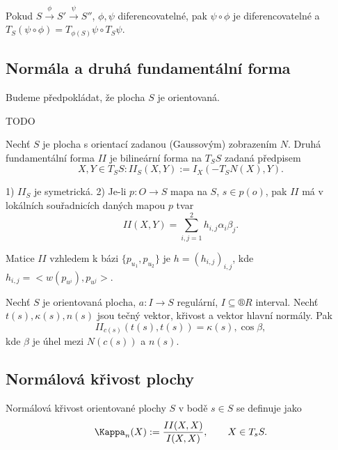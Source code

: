 \documentclass[12pt]{article}                   %
\begin{document}
        \begin{lemma}
            Pokud $S \overset{\phi}{\rightarrow} S' \overset{\psi}{\rightarrow} S''$, $\phi, \psi$ diferencovatelné, pak $\psi \circ \phi$ je diferencovatelné a $T_S(\psi \circ \phi) = T_{\phi(S)}\psi \circ T_S \psi$.
        \end{lemma}

    \subsection{Normála a druhá fundamentální forma}
        \begin{poznamka}
            Budeme předpokládat, že plocha $S$ je orientovaná.
        \end{poznamka}

        TODO

        \begin{definice}
            Nechť $S$ je plocha s orientací zadanou (Gaussovým) zobrazením $N$. Druhá fundamentální forma $II$ je bilineární forma na $T_SS$ zadaná předpisem
            $$ X, Y \in T_SS: II_S(X, Y) := I_X(-T_SN(X), Y). $$
        \end{definice}

        \begin{veta}
            1) $II_S$ je symetrická. 2) Je-li $p: O \rightarrow S$ mapa na $S$, $s \in p(o)$, pak $II$ má v lokálních souřadnicích daných mapou $p$ tvar
            $$ II(X, Y) = \sum_{i, j = 1}^2 h_{i, j}\alpha_i\beta_j. $$ 
        \end{veta}

        \begin{definice}
            Matice $II$ vzhledem k bázi $\{p_{u_1}, p_{u_2}\}$ je $h=(h_{i, j})_{i, j}$, kde $h_{i, j} = <w(p_{u^i}), p_{u^j}>$.
        \end{definice}


        \begin{veta}[Mensier]
            Nechť $S$ je orientovaná plocha, $a: I \rightarrow S$ regulární, $I \subseteq ®R$ interval. Nechť $t(s), \kappa(s), n(s)$ jsou tečný vektor, křivost a vektor hlavní normály. Pak
            $$ II_{c(s)} (t(s), t(s)) = \kappa(s), \cos \beta, $$ 
            kde $\beta$ je úhel mezi $N(c(s))$ a $n(s)$.
        \end{veta}

    \subsection{Normálová křivost plochy}
        \begin{definice}
            Normálová křivost orientované plochy $S$ v bodě $s \in S$ se definuje jako
            $$ \Kappa_n(X) := \frac{II(X, X)}{I(X, X)}, \qquad X \in T_sS. $$
        \end{definice}
\end{document}
